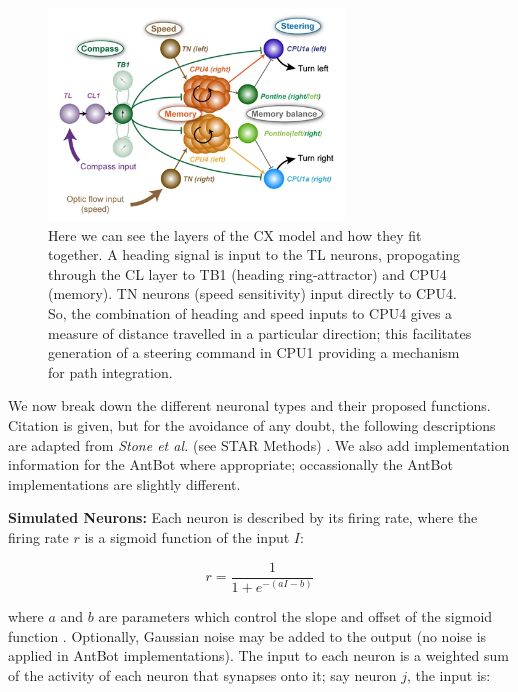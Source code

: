 \documentclass[a4paper,11pt,twoside,openright]{article}
\begin{document}
\begin{figure}[h!]
  \centering
  \includegraphics[width=0.7\textwidth]{Figure5F}
  \caption{
    \label{fig:cxlayer} Here we can see the layers of the CX model and
    how they fit together. A heading signal is input to the TL neurons,
    propogating through the CL layer to TB1 (heading ring-attractor) and
    CPU4 (memory). TN neurons (speed sensitivity) input directly to CPU4.
    So, the combination of heading and speed inputs to CPU4 gives a measure
    of distance travelled in a particular direction; this facilitates generation
    of a steering command in CPU1 providing a mechanism for path integration.
  }
\end{figure}

We now break down the different neuronal types and their proposed functions.
Citation is given, but for the avoidance of any doubt, the following descriptions
are adapted from \textit{Stone et al.} (see STAR Methods) \cite{Stone2017}.
We also add implementation information for the AntBot where appropriate;
occassionally the AntBot implementations are slightly different.
\newline
\par

\textbf{Simulated Neurons:}
Each neuron is described by its firing rate, where the firing rate $r$ is
a sigmoid function of the input $I$:

\begin{equation}\label{eq:sig}
r = \frac{1}{1 + e^{-(aI - b)}}
\end{equation}

where $a$ and $b$ are parameters which control the slope and offset of
the sigmoid function \cite{Stone2017}. Optionally, Gaussian noise may
be added to the output (no noise is applied in AntBot
implementations). The input to each neuron is a weighted sum of the
activity of each neuron that synapses onto it; say neuron $j$, the
input is:
\end{document}
